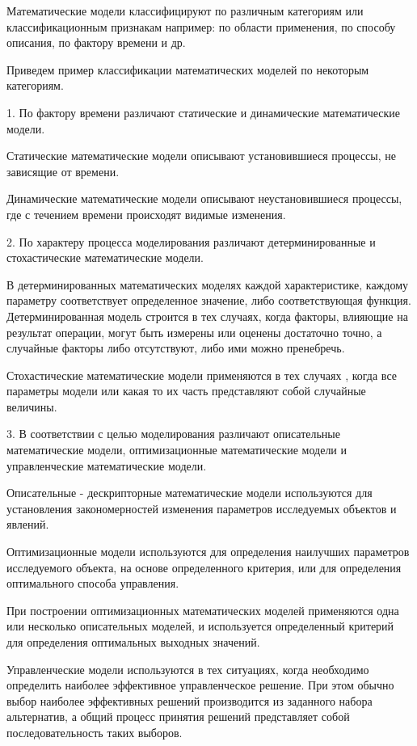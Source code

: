 Математические модели классифицируют по различным категориям или классификационным признакам например: по области применения, по способу описания, по фактору времени и др.\cite{b4}


Приведем пример классификации математических моделей по некоторым категориям.


1.	По фактору времени различают статические и динамические математические модели. 


Статические математические модели описывают установившиеся процессы, не зависящие от времени.


Динамические математические модели описывают неустановившиеся процессы, где с течением времени происходят видимые изменения.


2.	По характеру  процесса моделирования различают детерминированные и стохастические математические модели.


В детерминированных математических моделях каждой характеристике, каждому параметру соответствует определенное значение, либо соответствующая функция. Детерминированная модель строится в тех случаях, когда факторы, влияющие на результат операции, могут быть измерены или оценены достаточно точно, а случайные факторы либо отсутствуют, либо ими можно пренебречь.


Стохастические математические модели применяются в тех случаях , когда все параметры модели или какая то их часть представляют собой случайные величины. 


3.	В соответствии с целью моделирования различают описательные математические модели, оптимизационные математические модели и управленческие математические модели.


Описательные - дескрипторные математические модели используются для установления закономерностей изменения параметров исследуемых объектов и явлений. 


Оптимизационные модели используются для определения наилучших параметров исследуемого объекта, на основе определенного критерия, или для определения   оптимального способа управления. 


При построении оптимизационных математических моделей применяются одна или несколько описательных моделей, и используется определенный критерий для определения оптимальных выходных значений. 


Управленческие модели используются в тех ситуациях, когда необходимо определить наиболее эффективное управленческое решение. При этом обычно выбор наиболее эффективных решений производится из заданного набора альтернатив, а общий процесс принятия решений представляет собой последовательность таких выборов.


